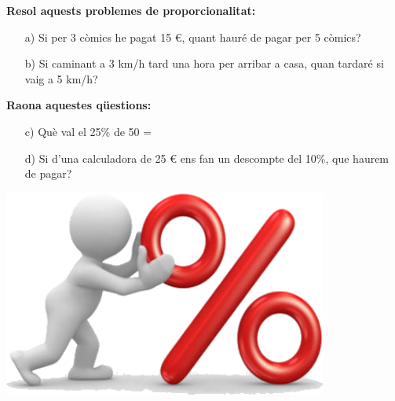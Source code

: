  
 \vso
 
 \begin{iniaval}
 	 	
 
 	\textbf{Resol aquests problemes de proporcionalitat:}
 	
 	\begin{itemize}
 	\item[a)] Si per 3 còmics he pagat 15 \euro, quant hauré de pagar per 5 còmics?
 	\vso
 	\item[b)] Si caminant a 3 km/h tard una hora per arribar a casa, quan tardaré si vaig a 5 km/h?
 	\end{itemize}
 
  	\vso
\begin{minipage}{0.8\textwidth}
 	\textbf{Raona aquestes qüestions:}
 	\vspace{0.25cm}
 	\begin{itemize}
 		\item[c)] Què val el 25\% de 50 =
 		\vso
 		\item[d)] Si d'una calculadora de 25 \euro{}  ens fan un descompte del 10\%, que haurem de pagar?
 	\end{itemize}
 \end{minipage}
\begin{minipage}{0.2\textwidth}
	\vspace{-1.25cm}
	\includegraphics[width=0.8\textwidth]{img-07/porcentage}
\end{minipage}
 \vso
 	\vso
 	
 \end{iniaval}
 
 
 \pagebreak

